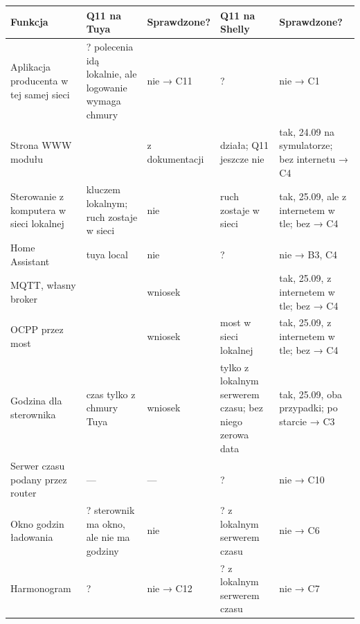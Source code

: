 \documentclass[11pt,a4paper]{article}
\begin{document}
\begin{longtable}{>{\raggedright\arraybackslash}p{3.95cm}>{\raggedright\arraybackslash}p{2.28cm}>{\raggedright\arraybackslash}p{2.35cm}>{\raggedright\arraybackslash}p{2.65cm}>{\raggedright\arraybackslash}p{3.18cm}}
\toprule
\rowcolor{apteallight}\textbf{Funkcja} & \textbf{Q11 na Tuya} & \textbf{Sprawdzone?} & \textbf{Q11 na Shelly} & \textbf{Sprawdzone?} \\
\midrule\endhead
\bottomrule\endfoot
Aplikacja producenta w tej samej sieci & ? polecenia idą lokalnie, ale logowanie wymaga chmury & nie {\symbolfont→} C11 & ? & nie {\symbolfont→} C1 \\
Strona WWW modułu & \leavevmode{\symbolfont\color{apred}\textbf{✘}} & z dokumentacji & \leavevmode{\symbolfont\color{apamber}\textbf{◐}} działa; Q11 jeszcze nie & tak, 24.09 na symulatorze; bez internetu {\symbolfont→} C4 \\
Sterowanie z komputera w sieci lokalnej & \leavevmode{\symbolfont\color{apamber}\textbf{◐}} kluczem lokalnym; ruch zostaje w sieci & nie & \leavevmode{\symbolfont\color{apgreen}\textbf{✔}} ruch zostaje w sieci & tak, 25.09, ale z internetem w tle; bez {\symbolfont→} C4 \\
Home Assistant & \leavevmode{\symbolfont\color{apamber}\textbf{◐}} tuya local & nie & ? & nie {\symbolfont→} B3, C4 \\
MQTT, własny broker & \leavevmode{\symbolfont\color{apred}\textbf{✘}} & wniosek & \leavevmode{\symbolfont\color{apgreen}\textbf{✔}} & tak, 25.09, z internetem w tle; bez {\symbolfont→} C4 \\
OCPP przez most & \leavevmode{\symbolfont\color{apred}\textbf{✘}} & wniosek & \leavevmode{\symbolfont\color{apamber}\textbf{◐}} most w sieci lokalnej & tak, 25.09, z internetem w tle; bez {\symbolfont→} C4 \\
Godzina dla sterownika & \leavevmode{\symbolfont\color{apred}\textbf{✘}} czas tylko z chmury Tuya & wniosek & \leavevmode{\symbolfont\color{apamber}\textbf{◐}} tylko z lokalnym serwerem czasu; bez niego zerowa data & tak, 25.09, oba przypadki; po starcie {\symbolfont→} C3 \\
Serwer czasu podany przez router & — & — & ? & nie {\symbolfont→} C10 \\
Okno godzin ładowania & ? sterownik ma okno, ale nie ma godziny & nie & ? z lokalnym serwerem czasu & nie {\symbolfont→} C6 \\
Harmonogram & ? & nie {\symbolfont→} C12 & ? z lokalnym serwerem czasu & nie {\symbolfont→} C7 \\

\end{longtable}
\end{document}
